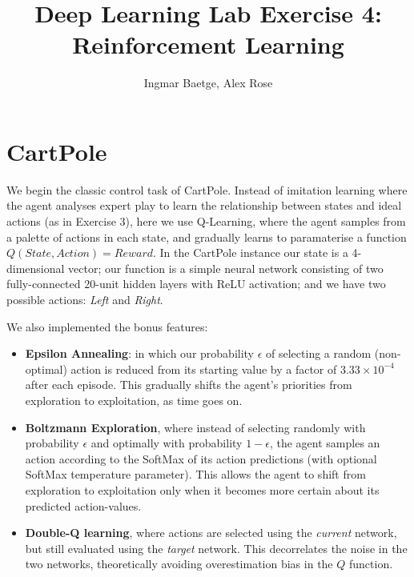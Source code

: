 \documentclass[a4paper, 11pt, conference]{ieeeconf}      %
\title{\LARGE \bf
Deep Learning Lab Exercise 4: Reinforcement Learning}
\author{Ingmar Baetge, Alex Rose}
\begin{document}

\maketitle


\section{CartPole}

We begin the classic control task of CartPole. Instead of imitation learning where the agent analyses expert play to learn the relationship between states and ideal actions (as in Exercise 3), here we use Q-Learning, where the agent samples from a palette of actions in each state, and gradually learns to paramaterise a function $Q(State, Action) = Reward$. In the CartPole instance our state is a 4-dimensional vector; our function is a simple neural network consisting of two fully-connected 20-unit hidden layers with ReLU activation; and we have two possible actions: \textit{Left} and \textit{Right}.

We also implemented the bonus features:

\begin{itemize}
	\item \textbf{Epsilon Annealing}: in which our probability $\epsilon$ of selecting a random (non-optimal) action is reduced from its starting value by a factor of $3.33 \times 10^{-4}$ after each episode. This gradually shifts the agent's priorities from exploration to exploitation, as time goes on.

	\item \textbf{Boltzmann Exploration}, where instead of selecting randomly with probability $\epsilon$ and optimally with probability $1 - \epsilon$, the agent samples an action according to the SoftMax of its action predictions (with optional SoftMax temperature parameter). This allows the agent to shift from exploration to exploitation only when it becomes more certain about its predicted action-values.

	\item \textbf{Double-Q learning}, where actions are selected using the \textit{current} network, but still evaluated using the \textit{target} network. This decorrelates the noise in the two networks, theoretically avoiding overestimation bias in the $Q$ function.

\end{itemize}
\end{document}
